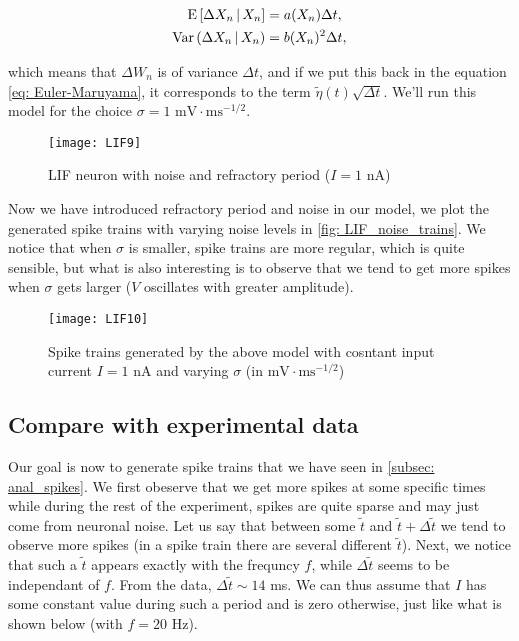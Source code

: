 \begin{align}
  \mathrm{E}\thinspace[\Delta X_n \thinspace|\thinspace X_n] & 
  = a(X_n)\Delta t,\\
  \mathrm{Var}\thinspace(\Delta X_n \thinspace|\thinspace X_n) & 
  = b(X_n)^2\Delta t,
\end{align}

\noindent
which means that $\Delta W_n$ is of variance $\Delta t$, and if we put this
back in the equation \eqref{eq: Euler-Maruyama}, it corresponds to the term
$\tilde{\eta}(t)\sqrt{\Delta t}$. We'll run this model for the choice 
$\sigma = 1$ $\mathrm{mV\cdot ms^{-1/2}}$.

\vspace{-1em}
\begin{figure}[H]
  \centering
  \texttt{[image: LIF9]}
  \caption{LIF neuron with noise and refractory period ($I=1$ nA)}
\end{figure}

Now we have introduced refractory period and noise in our model, we plot
the generated spike trains with varying noise levels in 
\autoref{fig: LIF_noise_trains}. We notice that when
$\sigma$ is smaller, spike trains are more regular, which is quite sensible,
but what is also interesting is to observe that we tend to get more spikes
when $\sigma$ gets larger ($V$ oscillates with greater amplitude).

\begin{figure}[H]
  \centering
  \texttt{[image: LIF10]}
  \caption{Spike trains generated by the above model with cosntant input
           current $I = 1$ nA and varying $\sigma$ (in 
           $\mathrm{mV\cdot ms^{-1/2}}$)}
  \label{fig: LIF_noise_trains}
\end{figure}


\subsection{Compare with experimental data}

Our goal is now to generate spike trains that we have seen in 
\ref{subsec: anal_spikes}. We first obeserve that we get more spikes at some
specific times while during the rest of the experiment, spikes are quite 
sparse and may just come from neuronal noise. Let us say that between some 
$\tilde{t}$ and $\tilde{t} + \Delta\tilde{t}$ we tend to observe more spikes 
(in a spike train there are several different $\tilde{t}$). 
Next, we notice that such a $\tilde{t}$ appears exactly with the frequncy $f$,
while $\Delta\tilde{t}$ seems to be independant of $f$. From the data, 
$\Delta\tilde{t} \sim 14$ ms. We can thus assume that $I$ has some 
constant value during such a period and is zero otherwise, just like what 
is shown below (with $f = 20$ Hz).

